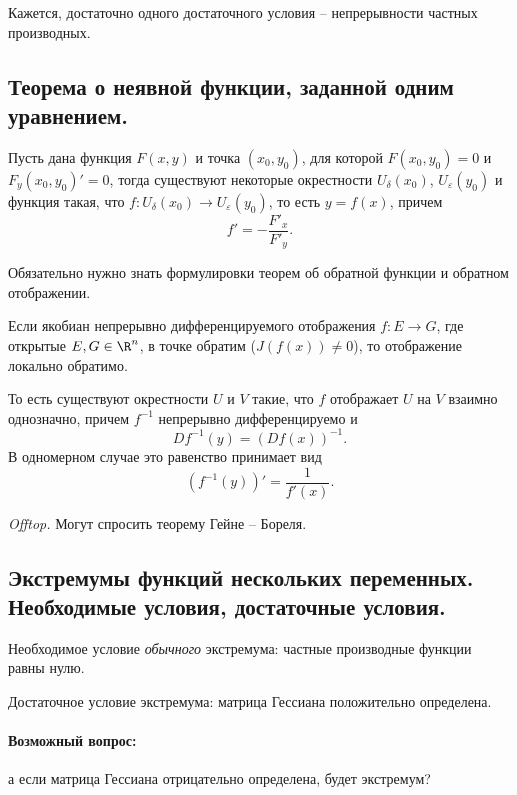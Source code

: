 Кажется, достаточно одного достаточного условия -- непрерывности частных производных.

\subsection{Теорема о неявной функции, заданной одним уравнением.}

Пусть дана функция $F(x, y)$ и точка $(x_0, y_0)$, для которой $F(x_0, y_0) = 0$ и $F_y(x_0, y_0)' = 0$, тогда существуют некоторые окрестности $U_{\delta}(x_0)$, $U_\varepsilon(y_0)$ и функция такая, что $f: U_{\delta}(x_0) \to U_{\varepsilon}(y_0)$, то есть $y = f(x)$, причем
\begin{equation*}
    f' = -\frac{F'_x}{F'_y}.
\end{equation*}

Обязательно нужно знать формулировки теорем об обратной функции и обратном отображении.

Если якобиан непрерывно дифференцируемого отображения $f: E \to G$, где открытые $E,G \in \R^n$, в точке обратим ($J(f(x)) \neq 0$), то отображение локально обратимо.

То есть существуют окрестности $U$ и $V$ такие, что $f$ отображает $U$ на $V$ взаимно однозначно, причем $f^{-1}$ непрерывно дифференцируемо и
\begin{equation*}
    Df^{-1}(y) = (Df(x))^{-1}.
\end{equation*}
В одномерном случае это равенство принимает вид
\begin{equation*}
    (f^{-1}(y))' = \frac{1}{f'(x)}.
\end{equation*}

\textit{Offtop.} Могут спросить теорему Гейне -- Бореля.

\subsection{Экстремумы функций нескольких переменных. Необходимые условия, достаточные условия.}

Необходимое условие \textit{обычного} экстремума: частные производные функции равны нулю.

Достаточное условие экстремума: матрица Гессиана положительно определена.

\paragraph*{Возможный вопрос:} а если матрица Гессиана отрицательно определена, будет экстремум?

